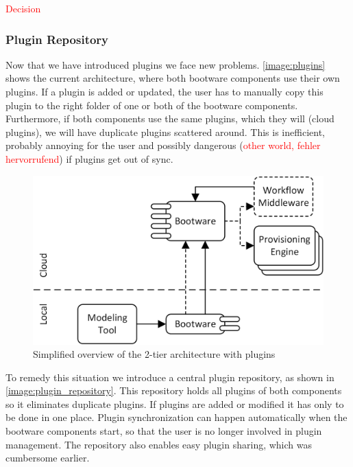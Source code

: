 \textcolor{red}{Decision}

\subsubsection{Plugin Repository}

Now that we have introduced plugins we face new problems.
\autoref{image:plugins} shows the current architecture, where both bootware components use their own plugins.
If a plugin is added or updated, the user has to manually copy this plugin to the right folder of one or both of the bootware components.
Furthermore, if both components use the same plugins, which they will (cloud plugins), we will have duplicate plugins scattered around.
This is inefficient, probably annoying for the user and possibly dangerous (\textcolor{red}{other world, fehler hervorrufend}) if plugins get out of sync.

\begin{figure}[!htbp]
	\centering
	\includegraphics[resolution=600]{design/assets/simple_plugins}
	\caption{Simplified overview of the 2-tier architecture with plugins}
	\label{image:plugins}
\end{figure}

To remedy this situation we introduce a central plugin repository, as shown in \autoref{image:plugin_repository}.
This repository holds all plugins of both components so it eliminates duplicate plugins.
If plugins are added or modified it has only to be done in one place.
Plugin synchronization can happen automatically when the bootware components start, so that the user is no longer involved in plugin management.
The repository also enables easy plugin sharing, which was cumbersome earlier.

